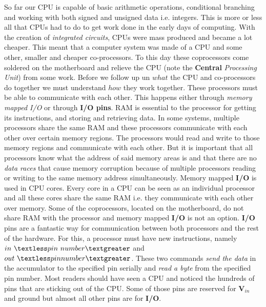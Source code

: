 So far our CPU is capable of basic arithmetic operations, conditional branching and working with
both signed and unsigned data i.e. integers. This is more or less all that CPUs had to do to get work
done in the early days of computing. With the creation of \textit{integrated circuits}, CPUs were mass 
produced and became a lot cheaper. This meant that a computer system was made of a CPU and some
other, smaller and cheaper co-processors. To this day these coprocessors come soldered on the
motherboard and relieve the CPU (note the \textbf{Central} \textit{Processing Unit}) from some work. Before we
follow up un $what$ the CPU and co-processors do together we must understand $how$ they work together.
These processors must be able to communicate with each other. This happens either through
\textit{memory mapped I/O} or through \textbf{I/O pins}. RAM is essential to the processor for getting its 
instructions, and storing and retrieving data. In some systems, multiple processors share the same RAM and these 
processors communicate with each other over certain memory regions. The processors would read and 
write to those memory regions and communicate with each other. But it is important that all processors
know what the address of said memory areas is and that there are no \textit{data races} that cause memory
corruption because of multiple processors reading or writing to the same memory address simultaneously. 
Memory mapped \textbf{I/O} is used in CPU cores. Every core in a CPU can be seen as an individual processor
and all these cores share the same RAM i.e. they communicate with each other over memory. 
Some of the coprocessors, located on the motherboard, do not share RAM with the processor and memory mapped 
\textbf{I/O} is not an option. \textbf{I/O} pins are a fantastic way for communication between both 
processors and the rest of the hardware. For this, a processor must have new instructions, namely 
$in\ \textless pin\ number\textgreater$ and $out\ \textless pin number\textgreater$. These two 
commands \textit{send the data} in the accumulator to the specified pin serially and \textit{read a byte} from the 
specified pin number. Most readers should have seen a CPU and noticed the hundreds of pins that are
sticking out of the CPU. Some of those pins are reserved for $\textbf{V}_\textit{in}$ and ground
but almost all other pins are for \textbf{I/O}.

